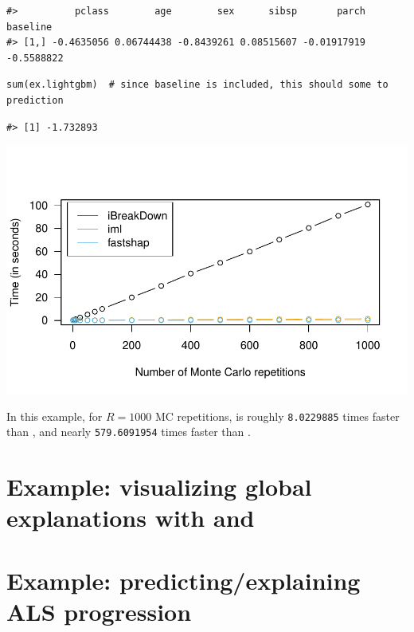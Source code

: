 \begin{verbatim}
#>          pclass        age        sex      sibsp       parch   baseline
#> [1,] -0.4635056 0.06744438 -0.8439261 0.08515607 -0.01917919 -0.5588822
\end{verbatim}

\begin{verbatim}
sum(ex.lightgbm)  # since baseline is included, this should some to prediction
\end{verbatim}

\begin{verbatim}
#> [1] -1.732893
\end{verbatim}

\includegraphics[width=1\linewidth]{greenwell_files/figure-latex/ex-titanic-benchmark-1}

In this example, for \(R = 1000\) MC repetitions,  is roughly \texttt{8.0229885} times faster than , and nearly \texttt{579.6091954} times faster than .

\hypertarget{example-visualizing-global-explanations-with-and}{%
\section{\texorpdfstring{Example: visualizing global explanations with  and }{Example: visualizing global explanations with  and }}\label{example-visualizing-global-explanations-with-and}}

\hypertarget{example-predictingexplaining-als-progression}{%
\section{Example: predicting/explaining ALS progression}\label{example-predictingexplaining-als-progression}}

